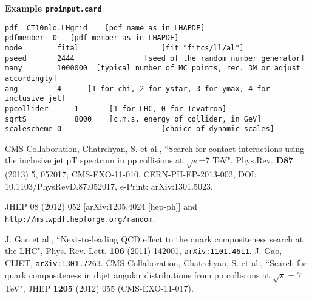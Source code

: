 \documentclass[aps,prd,preprint,nofootinbib]{revtex4}
\begin{document}
{\bf Example {\tt proinput.card}}

\begin{verbatim}
pdf  CT10nlo.LHgrid    [pdf name as in LHAPDF]
pdfmember  0   [pdf member as in LHAPDF]
mode		fital                   [fit "fitcs/ll/al"]
pseed		2444                [seed of the random number generator]
many		1000000  [typical number of MC points, rec. 3M or adjust accordingly]
ang			4      [1 for chi, 2 for ystar, 3 for ymax, 4 for inclusive jet]
ppcollider		1       [1 for LHC, 0 for Tevatron]
sqrtS			8000    [c.m.s. energy of collider, in GeV]
scalescheme	0                       [choice of dynamic scales]
\end{verbatim}


\begin{thebibliography}{99}
CMS Collaboration, Chatrchyan, S. et al., 
``Search for contact interactions using the inclusive jet pT spectrum in pp collisions at $\sqrt{s}$=7 TeV",  Phys.Rev. {\bf D87} (2013) 5, 052017;
CMS-EXO-11-010, CERN-PH-EP-2013-002,
DOI: 10.1103/PhysRevD.87.052017,
e-Print: arXiv:1301.5023.

JHEP 08 (2012) 052 [arXiv:1205.4024 [hep-ph]] and {\tt http://mstwpdf.hepforge.org/random}.
 
J. Gao et al., ``Next-to-leading QCD effect to the quark compositeness search at the LHC",
Phys. Rev. Lett. {\bf 106} (2011) 142001, {\tt arXiv:1101.4611}.
J. Gao, CIJET, {\tt arXiv:1301.7263}.
CMS Collaboration, Chatrchyan, S. et al., ``Search for quark compositeness in dijet angular distributions from pp collisions at $\sqrt{s}=7$ TeV",  JHEP {\bf 1205} (2012) 055 (CMS-EXO-11-017). 
\end{thebibliography}
\end{document}
